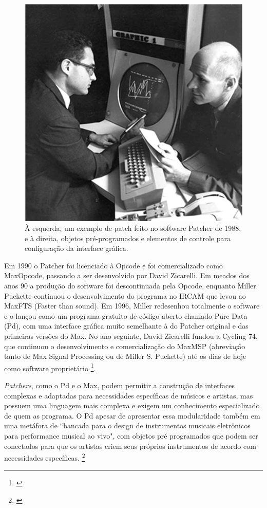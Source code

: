 \begin{figure}
    \caption{\label{patcher}À esquerda, um exemplo de patch feito no software Patcher de 1988, e à direita, objetos pré-programados e elementos de controle para configuração da interface gráfica.}
    
        \includegraphics[width=0.5\linewidth]{pictures/MaxHolmes-251}
    
\end{figure}


Em 1990 o Patcher foi licenciado à Opcode e foi comercializado como Max\/Opcode, passando a ser desenvolvido por David Zicarelli. Em meados dos anos 90 a produção do software foi descontinuada pela Opcode, enquanto Miller Puckette continuou o desenvolvimento do programa no IRCAM que levou ao Max\/FTS (Faster than sound). Em 1996, Miller redesenhou totalmente o software e o lançou como um programa gratuito de código aberto chamado Pure Data (Pd), com uma interface gráfica muito semelhante à do Patcher original e das primeiras versões do Max. No ano seguinte, David Zicarelli fundou a Cycling 74, que continuou o desenvolvimento e comercialização do Max\/MSP (abreviação tanto de Max Signal Processing ou de Miller S. Puckette) até os dias de hoje como software proprietário \footnote{\cite{Cryer2018}}.


\emph{Patchers}, como o Pd e o Max, podem permitir a construção de interfaces complexas e adaptadas para necessidades específicas de músicos e artistas, mas possuem uma linguagem mais complexa e exigem um conhecimento especializado de quem as programa. O Pd apesar de apresentar essa modularidade também em uma metáfora de ``bancada para o design de instrumentos musicais eletrônicos para performance musical ao vivo", com objetos pré programados que podem ser conectados para que os artistas criem seus próprios instrumentos de acordo com necessidades específicas. \footnote{\cite{PucketteMiller}}
 
